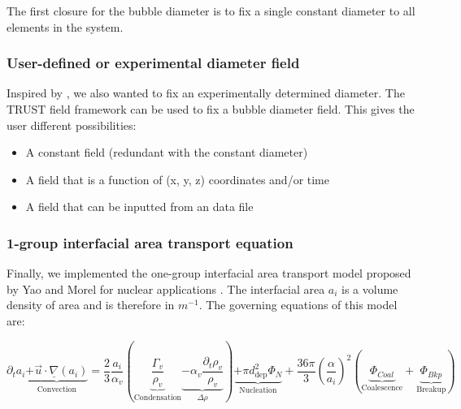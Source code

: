 The first closure for the bubble diameter is to fix a single constant diameter to all elements in the system. \\

\subsubsection{User-defined or experimental diameter field}

Inspired by \cite{Sugrue2017, Sugrue2017a}, we also wanted to fix an experimentally determined diameter. The TRUST field framework can be used to fix a bubble diameter field. This gives the user different possibilities:
\begin{itemize}
	\item A constant field (redundant with the constant diameter)
	\item A field that is a function of (x, y, z) coordinates and/or time
	\item A field that can be inputted from an data file
\end{itemize}

\subsubsection{1-group interfacial area transport equation}

Finally, we implemented the one-group interfacial area transport model proposed by Yao and Morel for nuclear applications \cite{Yao2004}. The interfacial area $a_i$ is a volume density of area and is therefore in $m^{-1}$. The governing equations of this model are:

\begin{equation}
	\partial_t a_i 
	\underbrace{+ \overrightarrow{u} \cdot \underline{\nabla}(a_i)}_\text{Convection} 
	= \frac{2}{3} \frac{a_i}{\alpha_v} 
		\left( \underbrace{\frac{\Gamma_v}{\rho_v}}_\text{Condensation} 
			   \underbrace{- \alpha_v\frac{\partial_t \rho_v}{\rho_v}}_{\Delta \rho } \right) 
	\underbrace{+ \pi d_\text{dep}^2 \Phi_N }_\text{Nucleation} 
	+ \frac{36 \pi}{3} \left(\frac{\alpha}{a_i}\right)^2 
		( \underbrace{\Phi_{Coal} }_\text{Coalescence}
		+ \underbrace{\Phi_{Bkp}  }_\text{Breakup} )
\end{equation}

